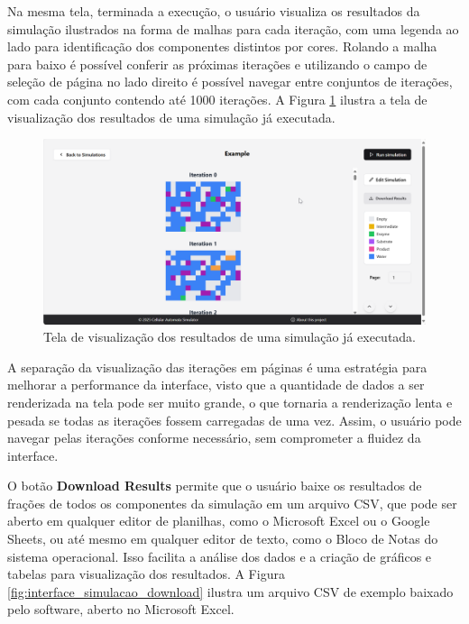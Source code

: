 \documentclass[12pt,oneside]{report}
\begin{document}
Na mesma tela, terminada a execução, o usuário visualiza os resultados da simulação ilustrados na forma de malhas para cada iteração, com uma legenda ao lado para identificação dos componentes distintos por cores. Rolando a malha para baixo é possível conferir as próximas iterações e utilizando o campo de seleção de página no lado direito é possível navegar entre conjuntos de iterações, com cada conjunto contendo até 1000 iterações. A Figura \ref{fig:interface_simulacao_resultados} ilustra a tela de visualização dos resultados de uma simulação já executada.

\begin{figure}[H]
    \centering
    \includegraphics[width=1\textwidth]{img/result_simulacao.png}
    \caption{\small Tela de visualização dos resultados de uma simulação já executada.}
    \label{fig:interface_simulacao_resultados}
\end{figure}

A separação da visualização das iterações em páginas é uma estratégia para melhorar a performance da interface, visto que a quantidade de dados a ser renderizada na tela pode ser muito grande, o que tornaria a renderização lenta e pesada se todas as iterações fossem carregadas de uma vez. Assim, o usuário pode navegar pelas iterações conforme necessário, sem comprometer a fluidez da interface.

O botão \textbf{Download Results} permite que o usuário baixe os resultados de frações de todos os componentes da simulação em um arquivo CSV, que pode ser aberto em qualquer editor de planilhas, como o Microsoft Excel ou o Google Sheets, ou até mesmo em qualquer editor de texto, como o Bloco de Notas do sistema operacional. Isso facilita a análise dos dados e a criação de gráficos e tabelas para visualização dos resultados. A
Figura \ref{fig:interface_simulacao_download} ilustra um arquivo CSV de exemplo baixado pelo software, aberto no Microsoft Excel.
\end{document}

